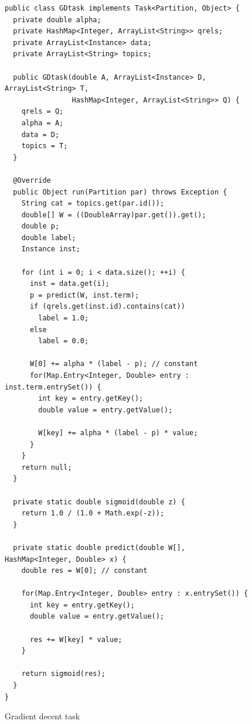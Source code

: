 \documentclass{sig-alternate-05-2015}
\begin{document}
\begin{figure}
  \begin{lstlisting}
public class GDtask implements Task<Partition, Object> {
  private double alpha;
  private HashMap<Integer, ArrayList<String>> qrels;
  private ArrayList<Instance> data;
  private ArrayList<String> topics;

  public GDtask(double A, ArrayList<Instance> D, ArrayList<String> T,
                HashMap<Integer, ArrayList<String>> Q) {
    qrels = Q;
    alpha = A;
    data = D;
    topics = T;
  }

  @Override
  public Object run(Partition par) throws Exception {
    String cat = topics.get(par.id());
    double[] W = ((DoubleArray)par.get()).get();
    double p;
    double label;
    Instance inst;

    for (int i = 0; i < data.size(); ++i) {
      inst = data.get(i);
      p = predict(W, inst.term);
      if (qrels.get(inst.id).contains(cat))
        label = 1.0;
      else
        label = 0.0;

      W[0] += alpha * (label - p); // constant
      for(Map.Entry<Integer, Double> entry : inst.term.entrySet()) {
        int key = entry.getKey();
        double value = entry.getValue();

        W[key] += alpha * (label - p) * value;
      }
    }
    return null;
  }

  private static double sigmoid(double z) {
    return 1.0 / (1.0 + Math.exp(-z));
  }

  private static double predict(double W[], HashMap<Integer, Double> x) {
    double res = W[0]; // constant

    for(Map.Entry<Integer, Double> entry : x.entrySet()) {
      int key = entry.getKey();
      double value = entry.getValue();

      res += W[key] * value;
    }
    
    return sigmoid(res);
  }
}
\end{lstlisting}
\caption{Gradient decent task}
\label{fig:GD}
\end{figure}
\end{document}
